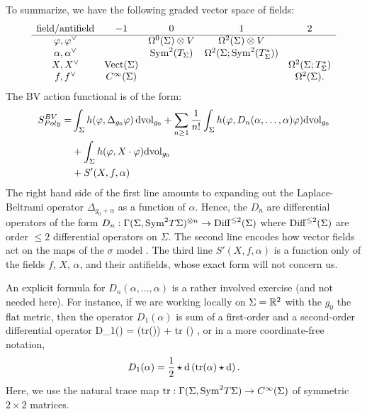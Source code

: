 To summarize, we have the following graded vector space of fields:
\[
\begin{array}{ccccc}
\text{field/antifield} & -1 &0 & 1 & 2\\
\hline
\varphi, \varphi^\vee & & \Omega^{0}(\Sigma) \otimes V & \Omega^2(\Sigma) \otimes V & \\
\alpha, \alpha^\vee & & {\rm Sym}^2(T_\Sigma) & \Omega^2(\Sigma ; {\rm Sym}^{2}(T^*_\Sigma)) & \\
X, X^\vee & {\rm Vect}(\Sigma) & & & \Omega^2(\Sigma ; T^*_\Sigma)\\
f, f^\vee & C^\infty(\Sigma) &&& \Omega^2(\Sigma) .
\end{array}
\]
The BV action functional is of the form:
\begin{align*}\label{polyakov bv}
S^{BV}_{Poly} = 
& \int_\Sigma h(\varphi, \Delta_{g_0} \varphi)\, {\rm dvol}_{g_0} + \sum_{n \geq 1} \frac{1}{n!} \int_{\Sigma} h(\varphi, D_n(\alpha,\ldots,\alpha) \varphi) {\rm dvol}_{g_0} \\
& +  \int_{\Sigma} h(\varphi, X \cdot \varphi) {\rm dvol}_{g_0} \\
& +  S'(X, f, \alpha) 
\end{align*}
The right hand side of the first line amounts to expanding out the Laplace-Beltrami operator $\Delta_{g_0 + \alpha}$ as a function of $\alpha$.
Hence, the $D_n$ are differential operators of the form 
$D_n : \Gamma(\Sigma , {\rm Sym}^2 T\Sigma)^{\otimes n} \to {\rm Diff}^{\leq 2} (\Sigma)$ 
where ${\rm Diff}^{\leq 2}(\Sigma)$ are order $\leq 2$ differential operators on $\Sigma$.
The second line encodes how vector fields act on the maps of the $\sigma$ model . 
The third line $S'(X, f, \alpha)$ is a function only of the fields $f$, $X$, $\alpha$, and their antifields,
whose exact form will not concern us. 

An explicit formula for $D_n(\alpha,\ldots,\alpha)$ is a rather involved exercise (and not needed here).
For instance, if we are working locally on $\Sigma = \mathbb R^2$ with the $g_0$ the flat metric, 
then the operator $D_1(\alpha)$ is sum of a first-order and a second-order differential operator
\ben
D_1(\alpha) =   ({\rm tr}(\alpha))  +  {\rm tr} (\alpha)  , 
\een
or in a more coordinate-free notation, 
\[
D_1(\alpha) = \frac{1}{2} \star {\rm d} \left({\rm tr}(\alpha) \star {\rm d}\right).
\] 
Here, we use the natural trace map ${\rm tr} : \Gamma(\Sigma , {\rm Sym}^2 T\Sigma) \to C^\infty(\Sigma)$ of symmetric $2\times2$ matrices. 

